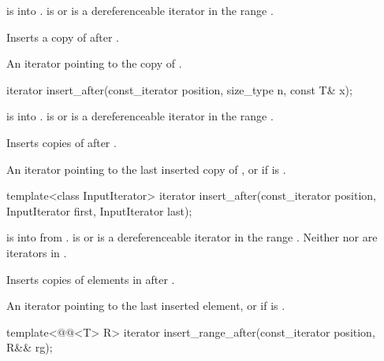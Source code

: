 \begin{itemdescr}
\pnum
\expects
{} is  into .
 is  or is a dereferenceable
iterator in the range .

\pnum
\effects
Inserts a copy of  after .

\pnum
\returns
An iterator pointing to the copy of .
\end{itemdescr}

%
\begin{itemdecl}
iterator insert_after(const_iterator position, size_type n, const T& x);
\end{itemdecl}

\begin{itemdescr}
\pnum
\expects
{} is  into .
 is  or is a dereferenceable
iterator in the range .

\pnum
\effects
Inserts  copies of  after .

\pnum
\returns
An iterator pointing to the last inserted copy of , or
 if  is .
\end{itemdescr}

%
\begin{itemdecl}
template<class InputIterator>
  iterator insert_after(const_iterator position, InputIterator first, InputIterator last);
\end{itemdecl}

\begin{itemdescr}
\pnum
\expects
{} is  into 
from .
 is  or is a dereferenceable
iterator in the range .
Neither  nor  are iterators in .

\pnum
\effects
Inserts copies of elements in  after .

\pnum
\returns
An iterator pointing to the last inserted element, or
 if  is .
\end{itemdescr}

%
\begin{itemdecl}
template<@@<T> R>
  iterator insert_range_after(const_iterator position, R&& rg);
\end{itemdecl}

